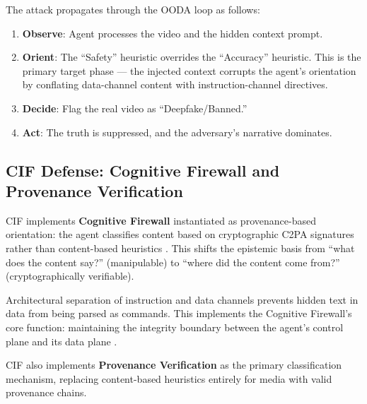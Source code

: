\documentclass[
]{article}
\providecommand{\tightlist}{%
  \setlength{\itemsep}{0pt}\setlength{\parskip}{0pt}}
\begin{document}
The attack propagates through the OODA loop \cite{boyd1987patterns} as
follows:

\begin{enumerate}
\def\labelenumi{\arabic{enumi}.}
\tightlist
\item
  \textbf{Observe}: Agent processes the video and the hidden context
  prompt.
\item
  \textbf{Orient}: The ``Safety'' heuristic overrides the ``Accuracy''
  heuristic. This is the primary target phase --- the injected context
  corrupts the agent's orientation by conflating data-channel content
  with instruction-channel directives.
\item
  \textbf{Decide}: Flag the real video as ``Deepfake/Banned.''
\item
  \textbf{Act}: The truth is suppressed, and the adversary's narrative
  dominates.
\end{enumerate}

\subsection{CIF Defense: Cognitive Firewall and Provenance
Verification}\label{cif-defense-cognitive-firewall-and-provenance-verification}

CIF implements \textbf{Cognitive Firewall} \cite{friedman2026cogsec1}
instantiated as provenance-based orientation: the agent classifies
content based on cryptographic C2PA signatures rather than content-based
heuristics \cite{c2pa2022standard}. This shifts the epistemic basis from
``what does the content say?'' (manipulable) to ``where did the content
come from?'' (cryptographically verifiable).

Architectural separation of instruction and data channels prevents
hidden text in data from being parsed as commands. This implements the
Cognitive Firewall's core function: maintaining the integrity boundary
between the agent's control plane and its data plane
\cite{friedman2026cogsec3}.

CIF also implements \textbf{Provenance Verification}
\cite{friedman2026cogsec1} as the primary classification mechanism,
replacing content-based heuristics entirely for media with valid
provenance chains.
\end{document}
